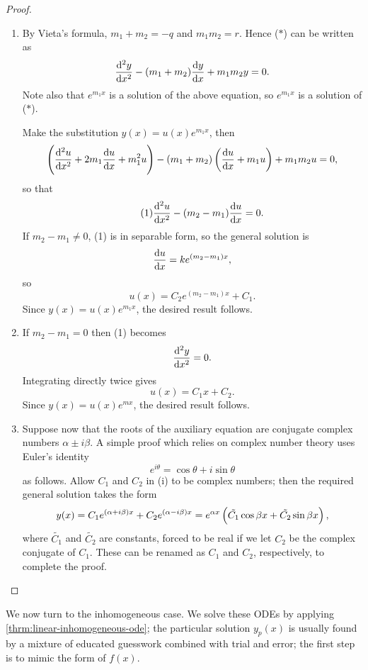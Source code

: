 \begin{proof} \
\begin{enumerate}[label=(\roman*)]
\item By Vieta's formula, $m_1+m_2=-q$ and $m_1m_2=r$. Hence ($\ast$) can be written as
\[\dv[2]{y}{x}-(m_1+m_2)\dv{y}{x}+m_1m_2y=0.\]
Note also that $e^{m_1x}$ is a solution of the above equation, so $e^{m_1x}$ is a solution of ($\ast$).

Make the substitution $y(x)=u(x)e^{m_1x}$, then
\[\left(\dv[2]{u}{x}+2m_1\dv{u}{x}+m_1^2u\right)-(m_1+m_2)\left(\dv{u}{x}+m_1u\right)+m_1m_2u=0,\]
so that
\begin{equation*}\tag{1}
\dv[2]{u}{x}-(m_2-m_1)\dv{u}{x}=0.
\end{equation*}
If $m_2-m_1\neq0$, (1) is in separable form, so the general solution is
\[\dv{u}{x}=ke^{(m_2-m_1)x},\]
so
\[u(x)=C_2e^{(m_2-m_1)x}+C_1.\]
Since $y(x)=u(x)e^{m_1x}$, the desired result follows.

\item If $m_2-m_1=0$ then (1) becomes
\[\dv[2]{y}{x}=0.\]
Integrating directly twice gives
\[u(x)=C_1x+C_2.\]
Since $y(x)=u(x)e^{mx}$, the desired result follows.

\item Suppose now that the roots of the auxiliary equation are conjugate complex numbers $\alpha\pm i\beta$. A simple proof which relies on complex number theory uses Euler's identity
\[e^{i\theta}=\cos\theta+i\sin\theta\]
as follows. Allow $C_1$ and $C_2$ in (i) to be complex numbers; then the required general solution takes the form
\[y(x)=C_1e^{(\alpha+i\beta)x}+C_2e^{(\alpha-i\beta)x}=e^{\alpha x}\left(\tilde{C_1}\cos\beta x+\tilde{C_2}\sin\beta x\right),\]
where $\tilde{C_1}$ and $\tilde{C_2}$ are constants, forced to be real if we let $C_2$ be the complex conjugate of $C_1$. These can be renamed as $C_1$ and $C_2$, respectively, to complete the proof.
\end{enumerate}
\end{proof}

We now turn to the inhomogeneous case. We solve these ODEs by applying \cref{thrm:linear-inhomogeneous-ode}; the particular solution $y_p(x)$ is usually found by a mixture of educated guesswork combined with trial and error; the first step is to mimic the form of $f(x)$.